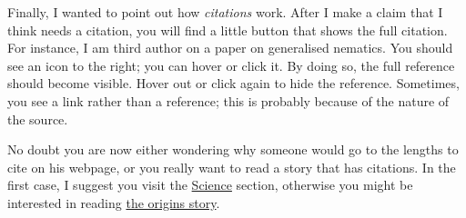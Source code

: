 \begin{multicols}{2}
Finally, I wanted to point out how \emph{citations} work. After I make a claim that I think needs a citation, you will find a little button that shows the full citation. For instance, I am third author on a paper on generalised nematics. You should see an icon to the right; you can hover or click it. By doing so, the full reference should become visible. Hover out or click again to hide the reference. Sometimes, you see a link rather than a reference; this is probably because of the nature of the source.

No doubt you are now either wondering why someone would go to the lengths to cite on his webpage, or you really want to read a story that has citations. In the first case, I suggest you visit the \href{./science}{Science} section, otherwise you might be interested in reading \href{./origins}{the origins story}.
\end{multicols}